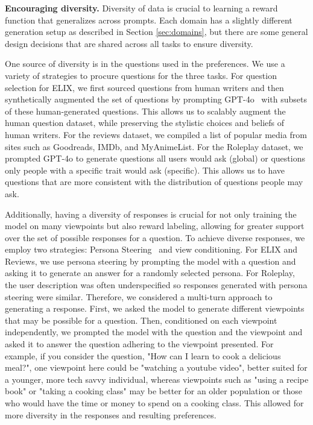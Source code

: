 \noindent \textbf{Encouraging diversity.}
Diversity of data is crucial to learning a reward function that generalizes across prompts. Each domain has a slightly different generation setup as described in Section \ref{sec:domains}, but there are some general design decisions that are shared across all tasks to ensure diversity.

One source of diversity is in the questions used in the preferences. We use a variety of strategies to procure questions for the three tasks. For question selection for ELIX, we first sourced questions from human writers and then synthetically augmented the set of questions by prompting GPT-4o~\citep{openai2024gpt4ocard} with subsets of these human-generated questions. This allows us to scalably augment the human question dataset, while preserving the stylistic choices and beliefs of human writers. For the reviews dataset, we compiled a list of popular media from sites such as Goodreads, IMDb, and MyAnimeList. For the Roleplay dataset, we prompted GPT-4o to generate questions all users would ask (global) or questions only people with a specific trait would ask (specific). This allows us to have questions that are more consistent with the distribution of questions people may ask.

Additionally, having a diversity of responses is crucial for not only training the model on many viewpoints but also reward labeling, allowing for greater support over the set of possible responses for a question. To achieve diverse responses, we employ two strategies: Persona Steering~\citep{cheng-etal-2023-marked} and view conditioning. For ELIX and Reviews, we use persona steering by prompting the model with a question and asking it to generate an answer for a randomly selected persona. For Roleplay, the user description was often underspecified so responses generated with persona steering were similar. Therefore, we considered a multi-turn approach to generating a response. First, we asked the model to generate different viewpoints that may be possible for a question. Then, conditioned on each viewpoint independently, we prompted the model with the question and the viewpoint and asked it to answer the question adhering to the viewpoint presented. For example, if you consider the question, "How can I learn to cook a delicious meal?", one viewpoint here could be "watching a youtube video", better suited for a younger, more tech savvy individual, whereas viewpoints such as "using a recipe book" or "taking a cooking class" may be better for an older population or those who would have the time or money to spend on a cooking class. This allowed for more diversity in the responses and resulting preferences. 

